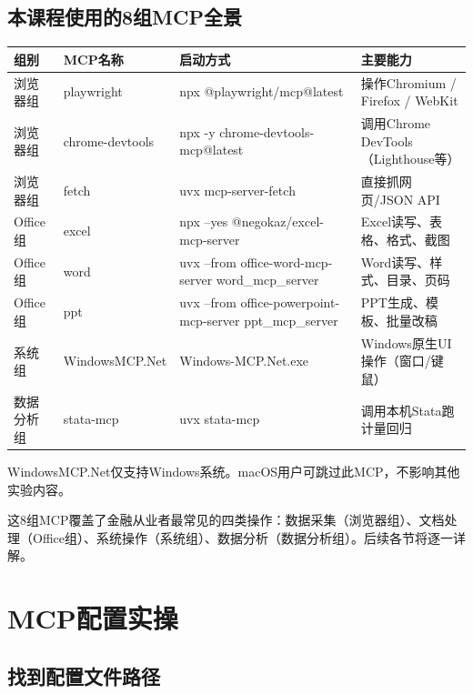 \subsection{本课程使用的8组MCP全景}

\begin{table}[H]
\centering
\begin{tabular}{lllp{4.5cm}}
\toprule
\textbf{组别} & \textbf{MCP名称} & \textbf{启动方式} & \textbf{主要能力} \\
\midrule
浏览器组 & playwright & npx @playwright/mcp@latest & 操作Chromium / Firefox / WebKit \\
浏览器组 & chrome-devtools & npx -y chrome-devtools-mcp@latest & 调用Chrome DevTools（Lighthouse等） \\
浏览器组 & fetch & uvx mcp-server-fetch & 直接抓网页/JSON API \\
Office组 & excel & npx --yes @negokaz/excel-mcp-server & Excel读写、表格、格式、截图 \\
Office组 & word & uvx --from office-word-mcp-server word\_mcp\_server & Word读写、样式、目录、页码 \\
Office组 & ppt & uvx --from office-powerpoint-mcp-server ppt\_mcp\_server & PPT生成、模板、批量改稿 \\
系统组 & WindowsMCP.Net & Windows-MCP.Net.exe & Windows原生UI操作（窗口/键鼠） \\
数据分析组 & stata-mcp & uvx stata-mcp & 调用本机Stata跑计量回归 \\
\bottomrule
\end{tabular}
\end{table}

\begin{warningbox}[macOS注意]
WindowsMCP.Net仅支持Windows系统。macOS用户可跳过此MCP，不影响其他实验内容。
\end{warningbox}

这8组MCP覆盖了金融从业者最常见的四类操作：数据采集（浏览器组）、文档处理（Office组）、系统操作（系统组）、数据分析（数据分析组）。后续各节将逐一详解。

\section{MCP配置实操}

\subsection{找到配置文件路径}

